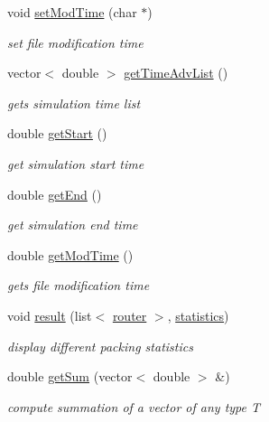 \begin{DoxyCompactItemize}
void \hyperlink{classmeasurement_ae5af86c6b09d4bc3bd8f648c371a3f9c}{setModTime} (char $\ast$)
\begin{DoxyCompactList}\small\item\em set file modification time \item\end{DoxyCompactList}\item 
vector$<$ double $>$ \hyperlink{classmeasurement_a83e8db5de390ad5efa9937a4db67c228}{getTimeAdvList} ()
\begin{DoxyCompactList}\small\item\em gets simulation time list \item\end{DoxyCompactList}\item 
double \hyperlink{classmeasurement_a0c29e12029b98174f084e9485c67c10c}{getStart} ()
\begin{DoxyCompactList}\small\item\em get simulation start time \item\end{DoxyCompactList}\item 
double \hyperlink{classmeasurement_a48411dc4fa236d3101ae2ab4c09eebb6}{getEnd} ()
\begin{DoxyCompactList}\small\item\em get simulation end time \item\end{DoxyCompactList}\item 
double \hyperlink{classmeasurement_a5e02e77e794e62cef5639ad02453ae12}{getModTime} ()
\begin{DoxyCompactList}\small\item\em gets file modification time \item\end{DoxyCompactList}\item 
void \hyperlink{classmeasurement_a18838caa4a3b08613e822aeb449d91ba}{result} (list$<$ \hyperlink{classrouter}{router} $>$, \hyperlink{classstatistics}{statistics})
\begin{DoxyCompactList}\small\item\em display different packing statistics \item\end{DoxyCompactList}\item 
double \hyperlink{classmeasurement_ab734bbbfdfa01be67553368501b32189}{getSum} (vector$<$ double $>$ \&)
\begin{DoxyCompactList}\small\item\em compute summation of a vector of any type T \item\end{DoxyCompactList}\item 

\end{DoxyCompactItemize}
